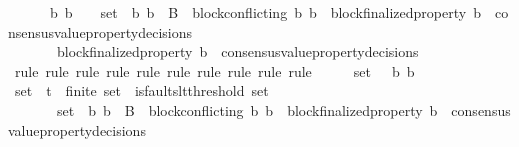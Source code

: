 \begin{isabellebody}
\ \ {\isasymlongrightarrow}\ {\isacharparenleft}{\isasymforall}\ {\isasymsigma}\ {\isasymsigma}{\isacharprime}\ b{}\ b{}{\isachardot}\ {\isacharbraceleft}{\isasymsigma}{\isacharcomma}\ {\isasymsigma}{\isacharprime}{\isacharbraceright}\ {\isasymsubseteq}\ {\isasymsigma}{\isacharunderscore}set\ {\isasymand}\ {\isacharbraceleft}b{}{\isacharcomma}\ b{}{\isacharbraceright}\ {\isasymsubseteq}\ B\ {\isasymand}\ block{\isacharunderscore}conflicting\ {\isacharparenleft}b{}{\isacharcomma}\ b{}{\isacharparenright}\ {\isasymand}\ block{\isacharunderscore}finalized{\isacharunderscore}property\ b{}\ {\isasymin}\ consensus{\isacharunderscore}value{\isacharunderscore}property{\isacharunderscore}decisions\ {\isasymsigma}\ \isanewline
\ \ \ \ \ \ {\isasymlongrightarrow}\ block{\isacharunderscore}finalized{\isacharunderscore}property\ b{}\ {\isasymnotin}\ consensus{\isacharunderscore}value{\isacharunderscore}property{\isacharunderscore}decisions\ {\isasymsigma}{\isacharprime}{\isacharparenright}{\isachardoublequoteclose}\isanewline
%
\isadelimproof
\ \ %
\endisadelimproof
%
\isatagproof
{}\isamarkupfalse%
\ {\isacharparenleft}rule{\isacharcomma}\ rule{\isacharcomma}\ rule{\isacharcomma}\ rule{\isacharcomma}\ rule{\isacharcomma}\ rule{\isacharcomma}\ rule{\isacharcomma}\ rule{\isacharcomma}\ rule{\isacharcomma}\ rule{\isacharparenright}\isanewline
{}\isamarkupfalse%
\ {\isacharminus}\isanewline
\ \ \isamarkupfalse%
\ {\isasymsigma}{\isacharunderscore}set\ {\isasymsigma}\ {\isasymsigma}{\isacharprime}\ b{}\ b{}\isanewline
\ \ \ \isamarkupfalse%
\ {\isachardoublequoteopen}{\isasymsigma}{\isacharunderscore}set\ {\isasymsubseteq}\ {\isasymSigma}t{\isachardoublequoteclose}\ \ {\isachardoublequoteopen}finite\ {\isasymsigma}{\isacharunderscore}set{\isachardoublequoteclose}\ \ {\isachardoublequoteopen}is{\isacharunderscore}faults{\isacharunderscore}lt{\isacharunderscore}threshold\ {\isacharparenleft}{\isasymUnion}{\isasymsigma}{\isacharunderscore}set{\isacharparenright}{\isachardoublequoteclose}\ \isanewline
\ \ \ \ {\isachardoublequoteopen}{\isacharbraceleft}{\isasymsigma}{\isacharcomma}\ {\isasymsigma}{\isacharprime}{\isacharbraceright}\ {\isasymsubseteq}\ {\isasymsigma}{\isacharunderscore}set\ {\isasymand}\ {\isacharbraceleft}b{}{\isacharcomma}\ b{}{\isacharbraceright}\ {\isasymsubseteq}\ B\ {\isasymand}\ block{\isacharunderscore}conflicting\ {\isacharparenleft}b{}{\isacharcomma}\ b{}{\isacharparenright}\ {\isasymand}\ block{\isacharunderscore}finalized{\isacharunderscore}property\ b{}\ {\isasymin}\ consensus{\isacharunderscore}value{\isacharunderscore}property{\isacharunderscore}decisions\ {\isasymsigma}{\isachardoublequoteclose}\ \isanewline

\end{isabellebody}
